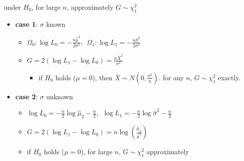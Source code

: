 \documentclass[10pt, landscape]{article}
\newcommand{\Xbar}{\bar{X}}
\begin{document}
\begin{multicols*}{4}
  under $H_0$, for large $n$, approximately $G \sim \chi^2_1$

  \begin{itemize}
    \item \textbf{case 1}: $\sigma$ known
      \begin{itemize}
        \item $\Omega_0 : \log L_0 = -\frac{n\hat\mu^2}{2\sigma^2}$, 
          $\;\Omega_1 : \log L_1 = -\frac{n\hat\sigma^2}{2\sigma^2}$
        \item $G = 2(\log L_1 - \log L_0) = \frac{n\Xbar^2}{\sigma^2}$
          \begin{itemize}
            \item if $H_0$ holds ($\mu = 0$), then $\Xbar \sim N(0, \frac{\sigma^2}{n})$. 
              for any $n$, $G \sim \chi^2_1$ exactly.
          \end{itemize}
      \end{itemize}

    \item \textbf{case 2}: $\sigma$ unknown
      \begin{itemize}
        \item $\log L_0 = -\frac{n}{2} \log \hat\mu_2 - \frac{n}{2}$, $\;\log L_1 = -\frac{n}{2} \log \hat\sigma^2 - \frac{n}{2}$
        \item $G = 2(\log L_1 - \log L_0) = n\log ( \frac{\hat\mu_2}{\hat\sigma^2} )$
        \item if $H_0$ holds ($\mu = 0$), for large $n$, $G \sim \chi^2_1$ approximately
      \end{itemize}
  \end{itemize}

\end{multicols*}
\end{document}

